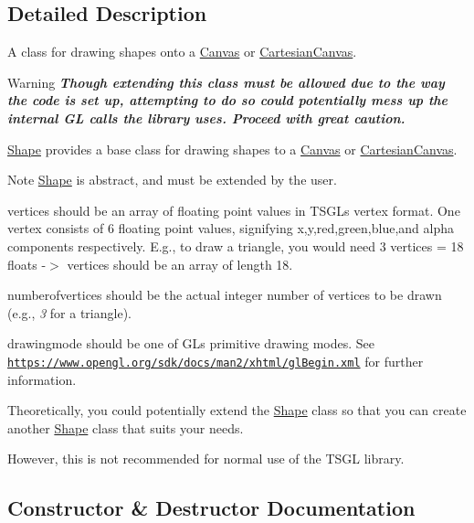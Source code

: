 \subsection{Detailed Description}
A class for drawing shapes onto a \hyperlink{classtsgl_1_1_canvas}{Canvas} or \hyperlink{classtsgl_1_1_cartesian_canvas}{Cartesian\+Canvas}. 

\begin{DoxyWarning}{Warning}
{\bfseries {\itshape Though extending this class must be allowed due to the way the code is set up, attempting to do so could potentially mess up the internal GL calls the library uses. Proceed with great caution.}}
\end{DoxyWarning}
\hyperlink{classtsgl_1_1_shape}{Shape} provides a base class for drawing shapes to a \hyperlink{classtsgl_1_1_canvas}{Canvas} or \hyperlink{classtsgl_1_1_cartesian_canvas}{Cartesian\+Canvas}. \begin{DoxyNote}{Note}
\hyperlink{classtsgl_1_1_shape}{Shape} is abstract, and must be extended by the user.
\end{DoxyNote}
{\ttfamily vertices} should be an array of floating point values in T\+S\+GL\textquotesingle{}s vertex format. One vertex consists of 6 floating point values, signifying x,y,red,green,blue,and alpha components respectively. E.\+g., to draw a triangle, you would need 3 vertices = 18 floats -\/$>$ vertices should be an array of length 18.

{\ttfamily numberofvertices} should be the actual integer number of vertices to be drawn (e.\+g., {\itshape 3} for a triangle).

{\ttfamily drawingmode} should be one of GL\textquotesingle{}s primitive drawing modes. See \href{https://www.opengl.org/sdk/docs/man2/xhtml/glBegin.xml}{\tt https\+://www.\+opengl.\+org/sdk/docs/man2/xhtml/gl\+Begin.\+xml} for further information.

Theoretically, you could potentially extend the \hyperlink{classtsgl_1_1_shape}{Shape} class so that you can create another \hyperlink{classtsgl_1_1_shape}{Shape} class that suits your needs.

However, this is not recommended for normal use of the T\+S\+GL library. 

\subsection{Constructor \& Destructor Documentation}
\mbox{\label{classtsgl_1_1_shape_a2e6d954b348471650b72d8e0519288ed}} 
